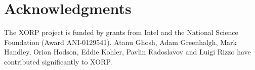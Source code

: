 
\section*{Acknowledgments}

The XORP project is funded by grants from Intel and the National
Science Foundation (Award ANI-0129541).  Atanu Ghosh, Adam
Greenhalgh, Mark Handley, Orion Hodson, Eddie Kohler, Pavlin
Radoslavov and Luigi Rizzo have contributed significantly to XORP.

